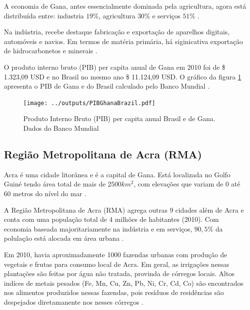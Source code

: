 A economia de Gana, antes essencialmente dominada pela agricultura, 
agora está distribuída entre: industria $19\%$, agricultura $30\%$ 
e serviços $51\%$ \citep{ghanacensus2013}.

Na indústria, recebe destaque fabricação e exportação de aparelhos digitais, 
automóveis e navios. Em termos de matéria primária, há siginicativa 
exportação de hidrocarbonetos e minerais \citep{ghanacensus2013}.

O produto interno bruto (PIB) per capita anual de Gana em 2010 foi
de \$ 1.323,09 USD e no Brasil no mesmo ano \$ 11.124,09 USD.
O gráfico da figura \ref{fg:pib} apresenta o PIB de Gana e do Brasil 
calculado pelo Banco Mundial \citep{bancomundial}.

\begin{figure}[H]
\begin{center}
  \texttt{[image: ../outputs/PIBGhanaBrazil.pdf]}
  \caption{Produto Interno Bruto (PIB) per capita anual Brasil e de Gana. 
           Dados do Banco Mundial \citep{bancomundial} \label{fg:pib}}
\end{center}
\end{figure}


\subsection{Região Metropolitana de Acra (RMA)}

Acra é uma cidade litorânea e é a capital de Gana. Está localizada 
no Golfo Guiné tendo área total de mais de  $2500 km^2$, com elevações que 
variam de 0 até 60 metros do nível do mar \citep{ARKU2008}.

A Região Metropolitana de Acra (RMA) agrega outras 9 cidades
além de Acra e conta com uma população total de 4 milhões de habitantes (2010). 
Com economia baseada majoritariamente na indústria e em serviços, 
$90,5\%$ da polulação está alocada em área urbana \citep{ghanacensus2013}.


Em 2010, havia aproximadamente 1000 fazendas urbanas com produção de vegetais e
frutas para consumo local de Acra. Em geral, as irrigações nessas plantações
são feitas por água não tratada, provinda de córregos locais. 
Altos indíces de metais pesados (Fe, Mn, Cu, Zn, Pb, Ni, Cr, Cd, Co)
são encontrados nos alimentos produzidos nessas fazendas, pois resíduos de
residências são despejados diretamanente nos nesses córregos \citep{lente2014}.

